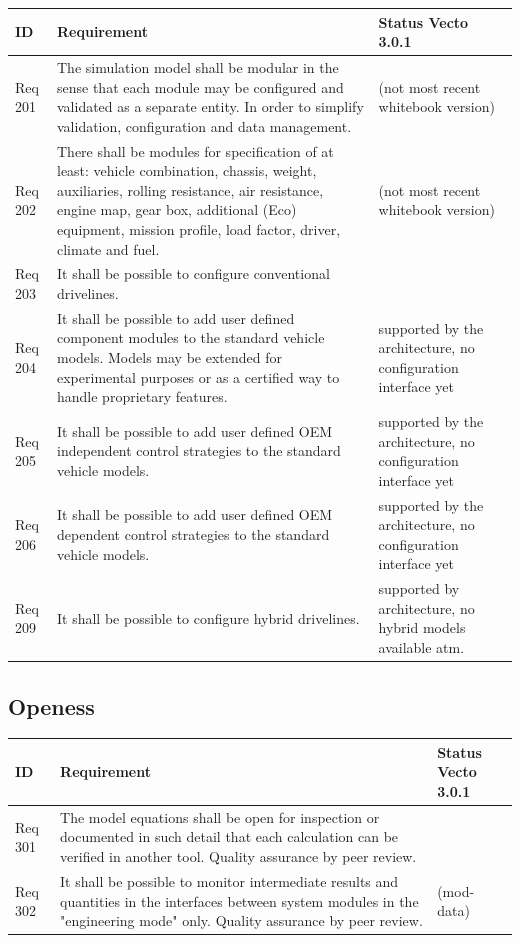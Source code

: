 \begin{tabular}{L{\IdColWidth}|L{\ReqColWidth}|M{\StatusColWidth}}
ID & Requirement & Status Vecto 3.0.1 \\ \hline\hline
Req 201 & The simulation model shall be modular in the sense that each module may be configured and validated as a separate entity.	In order to simplify validation, configuration and data management. & 
	\Vcheck \newline (not most recent whitebook version)	\\ \hline
Req 202 & There shall be modules for specification of at least: vehicle combination, chassis, weight, auxiliaries, rolling resistance, air resistance, engine map, gear box, additional (Eco) equipment, mission profile, load factor, driver, climate and fuel. 	& 
	\Vcheck \newline (not most recent whitebook version)	\\ \hline
Req 203 & It shall be possible to configure conventional drivelines.	& 
	\Vcheck	\\ \hline
Req 204 & It shall be possible to add user defined component modules to the standard vehicle models.	Models may be extended for experimental purposes or as a certified way to handle proprietary features. & 
	supported by the architecture, no configuration interface yet	\\ \hline
Req 205 & It shall be possible to add user defined OEM independent control strategies to the standard vehicle models.	& 
	supported by the architecture, no configuration interface yet	\\ \hline
Req 206 & It shall be possible to add user defined OEM dependent control strategies to the standard vehicle models.	& 
	supported by the architecture, no configuration interface yet	\\ \hline
Req 209 & It shall be possible to configure hybrid drivelines.	& 
	supported by architecture, no hybrid models available atm.	\\ \hline
\end{tabular}

\subsection{Openess} %
\label{sub:openess}

\begin{tabular}{L{\IdColWidth}|L{\ReqColWidth}|M{\StatusColWidth}}
ID & Requirement & Status Vecto 3.0.1 \\ \hline\hline
Req 301 & The model equations shall be open for inspection or documented in such detail that each calculation can be verified in another tool.	Quality assurance by peer review. & 
	\Vcheck	\\ \hline
Req 302 & It shall be possible to monitor intermediate results and quantities in the interfaces between system modules in the  "engineering mode" only.	Quality assurance by peer review. & 
	\Vcheck \newline (mod-data)	\\ \hline
\end{tabular}

